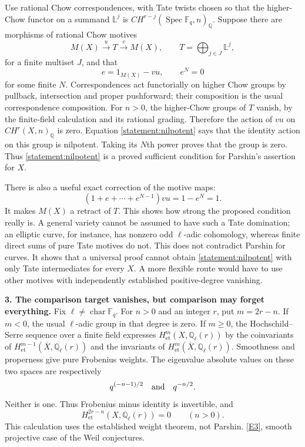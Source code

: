 \documentclass[11pt,a4paper]{article}
\newcommand{\Q}{\mathbb{Q}}
\newcommand{\F}{\mathbb{F}}
\newcommand{\eref}[2]{\hyperlink{extra:#1:#2}{[E#2]}}
\numberwithin{equation}{section}
\begin{document}
Use rational Chow correspondences, with Tate twists chosen so that the
higher-Chow functor on a summand $\mathbb L^j$ is
$CH^{r-j}(\operatorname{Spec}\F_q,n)_{\Q}$.
Suppose there are morphisms of rational Chow motives
\[
 M(X)\xrightarrow{u}T\xrightarrow{v}M(X),\qquad
 T=\bigoplus_{j\in J}\mathbb L^j,
\]
for a finite multiset $J$, and that
\begin{equation}\label{statement:nilpotent}
 e=1_{M(X)}-v u,\qquad e^N=0
\end{equation}
for some finite $N$. Correspondences act functorially on higher Chow
groups by pullback, intersection and proper pushforward; their
composition is the usual correspondence composition. For $n>0$, the
higher-Chow groups of $T$ vanish, by the finite-field calculation and
its rational grading. Therefore the action of $vu$ on
$CH^r(X,n)_{\Q}$ is zero. Equation \eqref{statement:nilpotent} says that the
identity action on this group is nilpotent. Taking its $N$th power
proves that the group is zero. Thus \eqref{statement:nilpotent} is a proved
sufficient condition for Parshin's assertion for $X$.

There is also a useful exact correction of the motive maps:
\[
 (1+e+\cdots+e^{N-1})vu=1-e^N=1.
\]
It makes $M(X)$ a retract of $T$. This shows how strong the proposed
condition really is. A general variety cannot be assumed to have such
a Tate domination; an elliptic curve, for instance, has nonzero odd
$\ell$-adic cohomology, whereas finite direct sums of pure Tate motives
do not. This does not contradict Parshin for curves. It shows that a
universal proof cannot obtain \eqref{statement:nilpotent} with only Tate
intermediates for every $X$. A more flexible route would have to use
other motives with independently established positive-degree vanishing.

\textbf{3. The comparison target vanishes, but comparison may forget everything.}
Fix $\ell\ne\operatorname{char}\F_q$. For $n>0$ and an integer $r$,
put $m=2r-n$. If $m<0$, the usual $\ell$-adic group in that degree is
zero. If $m\ge0$, the Hochschild--Serre sequence over a finite field
expresses $H^m_{\mathrm{et}}(X,\Q_\ell(r))$ by the coinvariants of
$H^{m-1}_{\mathrm{et}}(\overline X,\Q_\ell(r))$ and the invariants of
$H^m_{\mathrm{et}}(\overline X,\Q_\ell(r))$.
Smoothness and properness give pure Frobenius weights. The eigenvalue
absolute values on these two spaces are respectively
\[
 q^{(-n-1)/2}\quad\hbox{and}\quad q^{-n/2}.
\]
Neither is one. Thus Frobenius minus identity is invertible, and
\begin{equation}\label{statement:etale}
 H^{2r-n}_{\mathrm{et}}(X,\Q_\ell(r))=0\qquad(n>0).
\end{equation}
This calculation uses the established weight theorem, not Parshin.
\eref{statement}{3}, smooth projective case of the Weil conjectures.
\end{document}
